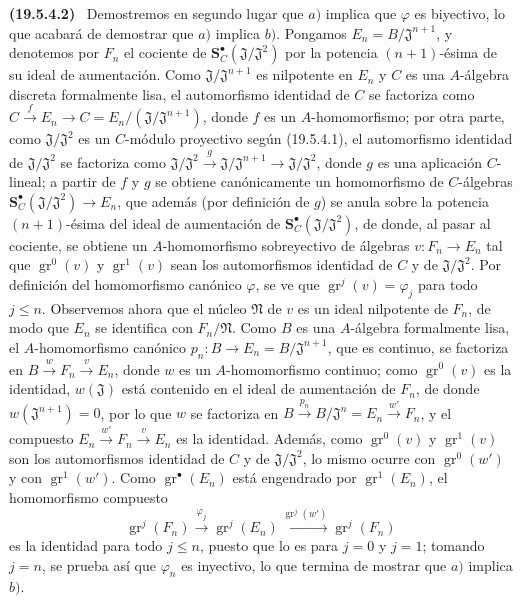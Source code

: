 \documentclass[10pt,oneside]{book}
\makeatletter
\newcommand{\gr}{\operatorname{gr}}
\newcommand{\setmanualcurrentlabel}[1]{\def\@currentlabel{#1}}
\newenvironment{env}[1][]{\setmanualcurrentlabel{#1}\par\medskip\noindent\textbf{(#1)}\ }{\par}
\makeatother
\begin{document}
\begin{env}[19.5.4.2]
\label{0.19.5.4.2-es}
Demostremos en segundo lugar que $a)$ implica que $\varphi$ es biyectivo, lo que
acabará de demostrar que $a)$ implica $b)$. Pongamos
$E_n=B/\mathfrak J^{n+1}$, y denotemos por $F_n$ el cociente de
$\mathbf S_C^\bullet(\mathfrak J/\mathfrak J^2)$ por la potencia $(n+1)$-ésima de
su ideal de aumentación. Como $\mathfrak J/\mathfrak J^{n+1}$ es nilpotente
en $E_n$ y $C$ es una $A$-álgebra discreta formalmente lisa,
el automorfismo identidad de $C$ se factoriza como
$C\xrightarrow{f}E_n\to C=E_n/(\mathfrak J/\mathfrak J^{n+1})$, donde $f$ es un
$A$-homomorfismo; por otra parte, como $\mathfrak J/\mathfrak J^2$ es un
$C$-módulo proyectivo según (19.5.4.1), el automorfismo identidad de
$\mathfrak J/\mathfrak J^2$ se factoriza como
$\mathfrak J/\mathfrak J^2\xrightarrow{g}\mathfrak J/\mathfrak J^{n+1}
\to\mathfrak J/\mathfrak J^2$, donde $g$ es una aplicación $C$-lineal; a
partir de $f$ y $g$ se obtiene canónicamente un homomorfismo de $C$-álgebras
$\mathbf S_C^\bullet(\mathfrak J/\mathfrak J^2)\to E_n$, que además (por
definición de $g$) se anula sobre la potencia $(n+1)$-ésima del ideal
de aumentación de $\mathbf S_C^\bullet(\mathfrak J/\mathfrak J^2)$, de donde, al
pasar al cociente, se obtiene un $A$-homomorfismo sobreyectivo de álgebras
$v:F_n\to E_n$ tal que $\gr^0(v)$ y $\gr^1(v)$ sean los automorfismos
identidad de $C$ y de $\mathfrak J/\mathfrak J^2$. Por definición del
homomorfismo canónico $\varphi$, se ve que $\gr^j(v)=\varphi_j$ para todo
$j\leq n$. Observemos ahora que el núcleo $\mathfrak N$ de $v$ es un ideal
nilpotente de $F_n$, de modo que $E_n$ se identifica con $F_n/\mathfrak N$. Como
$B$ es una $A$-álgebra formalmente lisa, el $A$-homomorfismo canónico
$p_n:B\to E_n=B/\mathfrak J^{n+1}$, que es continuo, se factoriza en
$B\xrightarrow{w}F_n\xrightarrow{v}E_n$, donde $w$ es un $A$-homomorfismo
continuo; como $\gr^0(v)$ es la identidad, $w(\mathfrak J)$ está contenido en
el ideal de aumentación de $F_n$, de donde $w(\mathfrak J^{n+1})=0$, por lo que
$w$ se factoriza en
$B\xrightarrow{p_n}B/\mathfrak J^n=E_n\xrightarrow{w'}F_n$, y el compuesto
$E_n\xrightarrow{w'}F_n\xrightarrow{v}E_n$ es la identidad. Además, como
$\gr^0(v)$ y $\gr^1(v)$ son los automorfismos identidad de $C$ y de
$\mathfrak J/\mathfrak J^2$, lo mismo ocurre con $\gr^0(w')$ y con
$\gr^1(w')$. Como $\gr^\bullet(E_n)$ está engendrado por $\gr^1(E_n)$, el
homomorfismo compuesto
\[
  \gr^j(F_n)\xrightarrow{\varphi_j}\gr^j(E_n)
  \xrightarrow{\gr^j(w')}\gr^j(F_n)
\]
es la identidad para todo $j\leq n$, puesto que lo es para $j=0$ y $j=1$;
tomando $j=n$, se prueba así que $\varphi_n$ es inyectivo, lo que termina de
mostrar que $a)$ implica $b)$.
\end{env}
\end{document}
